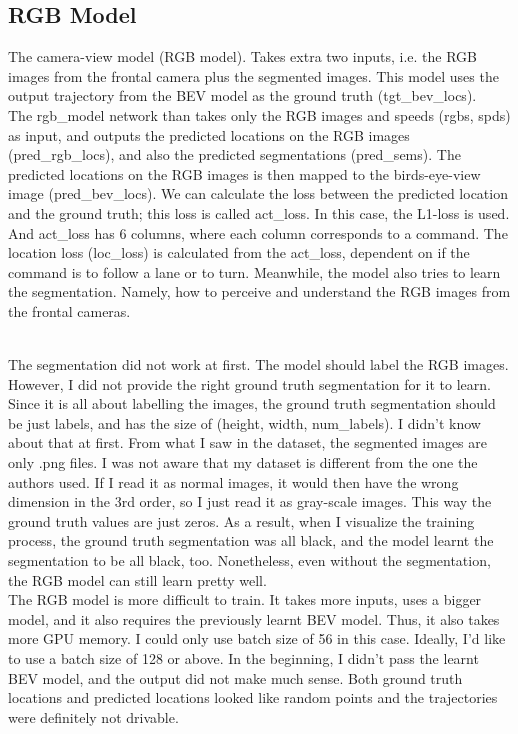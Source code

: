 \documentclass[inputenc=utf8]{ldvarticle}
\begin{document}
\subsection{RGB Model}
The camera-view model (RGB model). Takes extra two inputs, i.e. the RGB images from the frontal camera plus the segmented images. This model uses the output trajectory from the BEV model as the ground truth (tgt\_bev\_locs). 
\\

\noindent The rgb\_model network than takes only the RGB images and speeds (rgbs, spds) as input, and outputs the predicted locations on the RGB images (pred\_rgb\_locs), and also the predicted segmentations (pred\_sems). The predicted locations on the RGB images is then mapped to the birds-eye-view image (pred\_bev\_locs). We can calculate the loss between the predicted location and the ground truth; this loss is called act\_loss. In this case, the L1-loss is used. And act\_loss has 6 columns, where each column corresponds to a command. The location loss (loc\_loss) is calculated from the act\_loss, dependent on if the command is to follow a lane or to turn. Meanwhile, the model also tries to learn the segmentation. Namely, how to perceive and understand the RGB images from the frontal cameras.

\noindent \\The segmentation did not work at first. The model should label the RGB images. However, I did not provide the right ground truth segmentation for it to learn. Since it is all about labelling the images, the ground truth segmentation should be just labels, and has the size of (height, width, num\_labels). I didn’t know about that at first. From what I saw in the dataset, the segmented images are only .png files. I was not aware that my dataset is different from the one the authors used. If I read it as normal images, it would then have the wrong dimension in the 3rd order, so I just read it as gray-scale images. This way the ground truth values are just zeros. As a result, when I visualize the training process, the ground truth segmentation was all black, and the model learnt the segmentation to be all black, too. Nonetheless, even without the segmentation, the RGB model can still learn pretty well.
\\

\noindent The RGB model is more difficult to train. It takes more inputs, uses a bigger model, and it also requires the previously learnt BEV model. Thus, it also takes more GPU memory. I could only use batch size of 56 in this case. Ideally, I’d like to use a batch size of 128 or above. In the beginning, I didn’t pass the learnt BEV model, and the output did not make much sense. Both ground truth locations and predicted locations looked like random points and the trajectories were definitely not drivable.
\\
\end{document}
